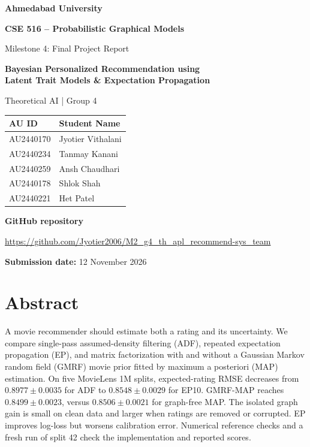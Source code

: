 \documentclass[11pt,a4paper]{article}
\begin{document}
\begin{titlepage}
\thispagestyle{empty}
\begin{center}
\vspace*{17mm}
{\Large\bfseries Ahmedabad University}\par\vspace{3mm}
{\Large\bfseries CSE 516 -- Probabilistic Graphical Models}\par\vspace{6mm}
{\large Milestone 4: Final Project Report}\par\vspace{17mm}
{\fontsize{18}{22}\selectfont\bfseries Bayesian Personalized Recommendation using\\[3pt]
Latent Trait Models \& Expectation Propagation}\par\vspace{7mm}
{\large Theoretical AI \quad | \quad Group 4}\par\vspace{13mm}
\renewcommand{\arraystretch}{1.2}
\begin{tabular}{ll}\toprule
\textbf{AU ID}&\textbf{Student Name}\\\midrule
AU2440170 & Jyotier Vithalani\\
AU2440234 & Tanmay Kanani\\
AU2440259 & Ansh Chaudhari\\
AU2440178 & Shlok Shah\\
AU2440221 & Het Patel\\\bottomrule
\end{tabular}
\vfill
\textbf{GitHub repository}\par
{\small\url{https://github.com/Jyotier2006/M2_g4_th_apl_recommend-sys_team}}\par\vspace{10mm}
\textbf{Submission date:} 12 November 2026
\end{center}
\end{titlepage}
\setcounter{page}{1}

\section*{Abstract}
A movie recommender should estimate both a rating and its uncertainty. We
compare single-pass assumed-density filtering (ADF), repeated expectation
propagation (EP), and matrix factorization with and without a Gaussian
Markov random field (GMRF) movie prior fitted by maximum a posteriori
(MAP) estimation. On five MovieLens 1M splits,
expected-rating RMSE decreases from $0.8977\pm0.0035$ for ADF to
$0.8548\pm0.0029$ for EP10. GMRF-MAP reaches $0.8499\pm0.0023$, versus
$0.8506\pm0.0021$ for graph-free MAP. The isolated graph gain is small on
clean data and larger when ratings are removed or corrupted. EP improves
log-loss but worsens calibration error. Numerical reference checks and a
fresh run of split 42 check the implementation and reported scores.
\end{document}
